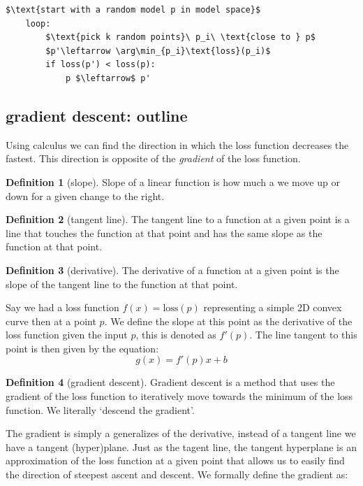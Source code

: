 \documentclass[12pt]{article}
\theoremstyle{definition}
\newtheorem{definition}{Definition}[section]
\begin{document}
\begin{lstlisting}[caption=branching search]
    $\text{start with a random model p in model space}$
    loop:
        $\text{pick k random points}\ p_i\ \text{close to } p$
        $p'\leftarrow \arg\min_{p_i}\text{loss}(p_i)$
        if loss(p') < loss(p):
            p $\leftarrow$ p'
\end{lstlisting}

\subsection{gradient descent: outline}

Using calculus we can find the direction in which the loss function decreases the fastest. This direction is opposite of the \textit{gradient} of the loss function.

\begin{definition}[slope]
    Slope of a linear function is how much a we move up or down for a given change to the right.
\end{definition}

\begin{definition}[tangent line]
    The tangent line to a function at a given point is a line that touches the function at that point and has the same slope as the function at that point.    
\end{definition}

\begin{definition}[derivative]
    The derivative of a function at a given point is the slope of the tangent line to the function at that point.
\end{definition}

Say we had a loss function $f(x) = \text{loss}(p)$ representing a simple 2D convex curve then at a point $p$. We define the slope at this point as the derivative of the loss function given the input $p$, this is denoted as $f'(p)$. The line tangent to this point is then given by the equation:
\begin{equation}
    g(x) = f'(p)x + b
\end{equation}

\begin{definition}[gradient descent]
    Gradient descent is a method that uses the gradient of the loss function to iteratively move towards the minimum of the loss function. We literally `descend the gradient'.
\end{definition}

The gradient is simply a generalizes of the derivative, instead of a tangent line we have a tangent (hyper)plane. Just as the tagent line, the tangent hyperplane is an approximation of the loss function at a given point that allows us to easily find the direction of steepest ascent and descent. We formally define the gradient as:
\end{document}
